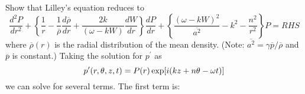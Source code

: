 \documentclass[onecolumn,10pt]{jhwhw}
\begin{document}
Show that Lilley’s equation reduces to
$$
\dfrac{d^2 P}{dr^2} + \left \{ \dfrac{1}{r} - \dfrac{1}{\overline{\rho}} \dfrac{d \overline{\rho}}{dr} + \dfrac{2k}{(\omega-kW)}  \dfrac{dW}{dr} \right \} \dfrac{dP}{dr} + \left \{ \dfrac{(\omega-kW)^2}{\overline{a^2}} -k^2-\dfrac{n^2}{r^2} \right \} P = RHS
$$
where $\overline{\rho}(r)$ is the radial distribution of the mean density. (Note: $\overline{a^2} = \gamma \overline{p}/\overline{\rho}$ and $\overline{p}$ is constant.)
\solution
Taking the solution for $p^{\prime}$ as
$$
p^{\prime} (r,\theta,z,t) = P(r) \exp[i(kz+n \theta - \omega t)]
$$
we can solve for several terms. The first term is:
\end{document}
